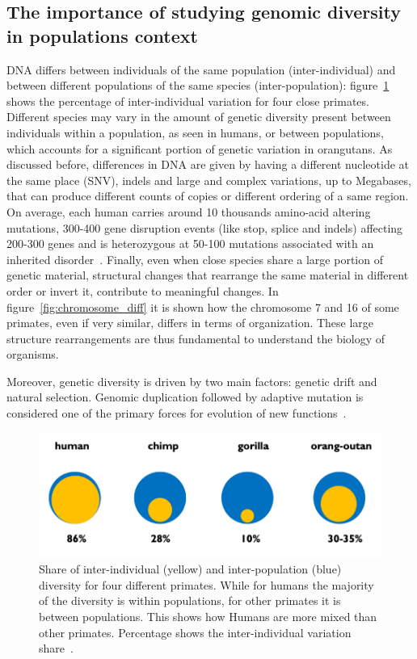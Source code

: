 \subsection{The importance of studying genomic diversity in populations context}
DNA differs between individuals of the same population (inter-individual) and between different populations of the same species (inter-population): figure~\ref{fig:pop_diff} shows the percentage of inter-individual variation for four close primates. Different species may vary in the amount of genetic diversity present between individuals within a population, as seen in humans, or between populations, which accounts for a significant portion of genetic variation in orangutans. As discussed before, differences in DNA are given by having a different nucleotide at the same place (SNV), indels and large and complex variations, up to Megabases, that can produce different counts of copies or different ordering of a same region. \\
On average, each human carries around 10 thousands amino-acid altering mutations, 300-400 gene disruption events (like stop, splice and indels) affecting 200-300 genes and is heterozygous at 50-100 mutations associated with an inherited disorder~\cite{genome_diversity_quintana}. 
Finally, even when close species share a large portion of genetic material, structural changes that rearrange the same material in different order or invert it, contribute to meaningful changes. In figure~\ref{fig:chromosome_diff} it is shown how the chromosome 7 and 16 of some primates, even if very similar, differs in terms of organization. These large structure rearrangements are thus fundamental to understand the biology of organisms.

Moreover, genetic diversity is driven by two main factors: genetic drift and natural selection. Genomic duplication followed by adaptive mutation is considered one of the primary forces for evolution of new functions~\cite{tbc1d3}.
\begin{figure}[!ht]
	\centering
	\includegraphics[width=.8\linewidth]{figures/background/pop_diff.png}
	\caption[Inter-individual and inter-population variation for 4 primate species.]{Share of inter-individual (yellow) and inter-population (blue) diversity for four different primates. While for humans the  majority of the diversity is within populations, for other primates it is between populations. This shows how Humans are more mixed than other primates. Percentage shows the inter-individual variation share~\cite{genome_diversity_quintana}.}
	\label{fig:pop_diff}
\end{figure}

